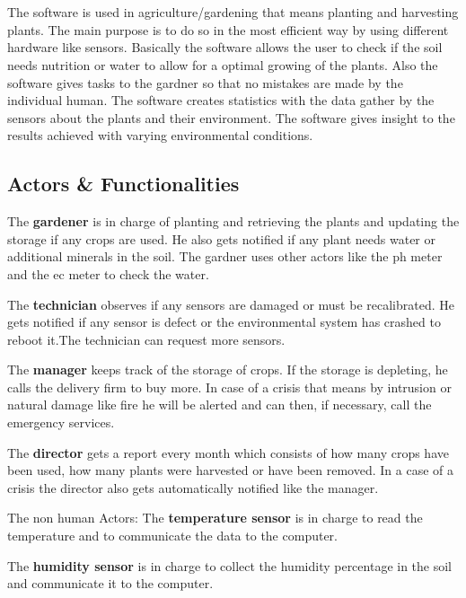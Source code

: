 \section{\mysystemname}

The software is used in agriculture/gardening that means planting and harvesting
plants. The main purpose is to do so in the most efficient way by using
different hardware like sensors. Basically the software allows the user to check
if the soil needs nutrition or water to allow for a optimal growing of the
plants. Also the software gives tasks to the gardner so that no mistakes are
made by the individual human. The software creates statistics with the data
gather by the sensors about the plants and their environment. The software gives
insight to the results achieved with varying environmental conditions.


\subsection{Actors \& Functionalities}

The \textbf{gardener} is in charge of planting and retrieving the plants and
updating the storage if any crops are used. He also gets notified if any plant
needs water or additional minerals in the soil. The gardner uses other actors
like the ph meter and the ec meter to check the water.\break

\noindent The \textbf{technician} observes if any sensors are damaged or must be
recalibrated. He gets notified if any sensor is defect or the environmental
system has crashed to reboot it.The technician can request more sensors.\break

\noindent The \textbf{manager} keeps track of the storage of crops. If the
storage is depleting, he calls the delivery firm to buy more. In case of a crisis that
means by intrusion or natural damage like fire he will be alerted and can then,
if necessary, call the emergency services.\break

\noindent The \textbf{director} gets a report every month which consists of how
many crops have been used, how many plants were harvested or have been removed. In a case
of a crisis the director also gets automatically notified like the
manager.\break

\noindent The non human Actors:\hfill \break\break
The \textbf{temperature sensor} is in charge to read the temperature and to
communicate the data to the computer.\hfill \break

\noindent The \textbf{humidity sensor} is in charge to collect the humidity
percentage in the soil and communicate it to the computer.\break

